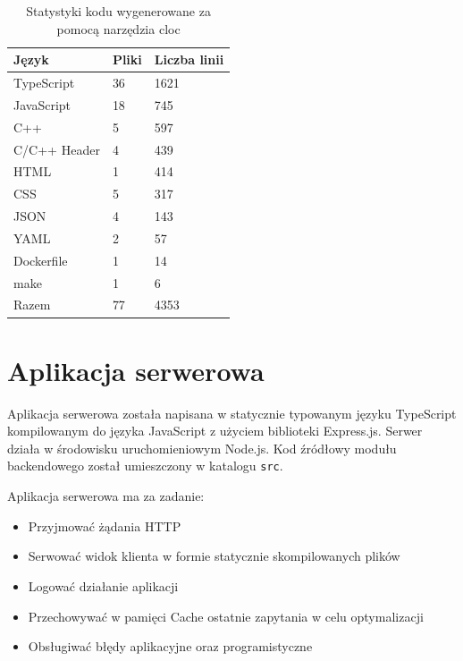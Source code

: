 \begin{table}[htbp]
    \centering
    \begin{tabular}{lll}
        Język & Pliki & Liczba linii \\
        \midrule
        TypeScript      &    36  & 1621  \\
        JavaScript      &    18  & 745   \\
        C++             &    5   & 597  \\
        C/C++ Header    &    4   & 439 \\
        HTML            &    1  & 414 \\
        CSS             &    5  & 317  \\
        JSON            &    4  & 143  \\
        YAML            &    2  & 57 \\
        Dockerfile      &    1  & 14 \\
        make            &    1  & 6 \\
        \bottomrule
        Razem           &    77 & 4353 \\
        \bottomrule
    \end{tabular}
    \caption{\label{tab:code-statistics}Statystyki kodu wygenerowane za pomocą narzędzia cloc}
\end{table}

\section{Aplikacja serwerowa}

Aplikacja serwerowa została napisana w statycznie typowanym języku TypeScript kompilowanym do języka JavaScript z użyciem biblioteki Express.js. Serwer działa w środowisku uruchomieniowym Node.js. Kod źródłowy modułu backendowego został umieszczony w katalogu \verb+src+.

Aplikacja serwerowa ma za zadanie:
\begin{itemize}
    \item Przyjmować żądania HTTP
    \item Serwować widok klienta w formie statycznie skompilowanych plików
    \item Logować działanie aplikacji 
    \item Przechowywać w pamięci Cache ostatnie zapytania w celu optymalizacji
    \item Obsługiwać błędy aplikacyjne oraz programistyczne
\end{itemize}

